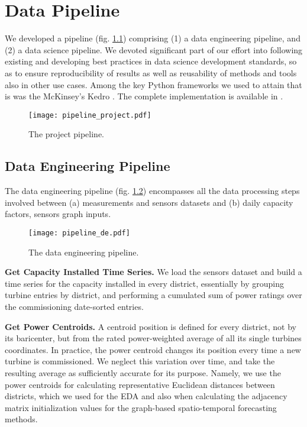 \graphicspath{{./figures/pipeline/}}

\chapter{Data Pipeline}
We developed a pipeline (fig. \ref{fig:project_pipeline}) comprising (1) a data engineering pipeline, and (2) a data science pipeline.
We devoted significant part of our effort into following existing and developing best practices in data science development standards, so as to ensure reproducibility of results as well as reusability of methods and tools also in other use cases.
Among the key Python frameworks we used to attain that is was the McKinsey's Kedro \cite{kedro}.
The complete implementation is available in \cite{windstfgithub}.

\begin{figure}[H]
	\centering
    \caption{The project pipeline.}
    \texttt{[image: pipeline\_project.pdf]}
	\label{fig:project_pipeline}
\end{figure}


\section{Data Engineering Pipeline}
The data engineering pipeline (fig. \ref{fig:pipeline_de}) encompasses all the data processing steps involved between (a) measurements and sensors datasets and (b) daily capacity factors, sensors graph inputs.

\begin{figure}[H]
	\centering
    \caption{The data engineering pipeline.}
    \texttt{[image: pipeline\_de.pdf]}
	\label{fig:pipeline_de}
\end{figure}

\vspace{1em}
\noindent
\textbf{Get Capacity Installed Time Series.}  We load the sensors dataset and build a time series for the capacity installed in every district, essentially by grouping  turbine entries by district, and performing a cumulated sum of power ratings over the commissioning date-sorted entries.

\vspace{1em}
\noindent
\textbf{Get Power Centroids.}  A centroid position is defined for every district, not by its baricenter, but from the rated power-weighted average of all its single turbines coordinates. In practice, the power centroid changes its position every time  a new turbine is commissioned. We neglect this variation over time, and take the resulting average as sufficiently accurate for its purpose. Namely, we use the power centroids for calculating representative Euclidean distances between districts, which we used for the EDA and also when calculating the adjacency matrix initialization values for the graph-based spatio-temporal forecasting methods.

